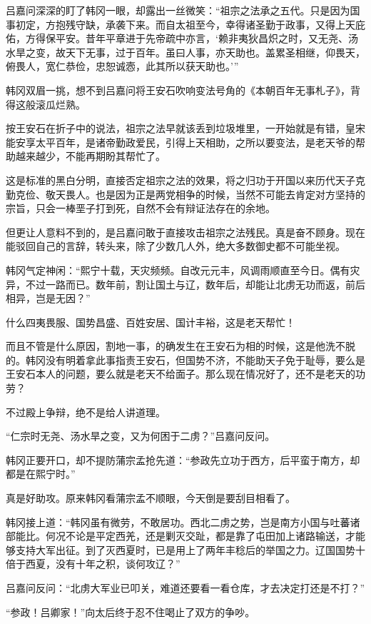 吕嘉问深深的盯了韩冈一眼，却露出一丝微笑：“祖宗之法承之五代。只是因为国事初定，方抱残守缺，承袭下来。而自太祖至今，幸得诸圣勤于政事，又得上天庇佑，方得保平安。昔年平章进于先帝疏中亦言，‘赖非夷狄昌炽之时，又无尧、汤水旱之变，故天下无事，过于百年。虽曰人事，亦天助也。盖累圣相继，仰畏天，俯畏人，宽仁恭俭，忠恕诚悫，此其所以获天助也。’”

韩冈双眉一挑，想不到吕嘉问将王安石吹响变法号角的《本朝百年无事札子》，背得这般滚瓜烂熟。

按王安石在折子中的说法，祖宗之法早就该丢到垃圾堆里，一开始就是有错，皇宋能安享太平百年，是诸帝勤政爱民，引得上天相助，之所以要变法，是老天爷的帮助越来越少，不能再期盼其帮忙了。

这是标准的黑白分明，直接否定祖宗之法的效果，将之归功于开国以来历代天子克勤克俭、敬天畏人。也是因为正是两党相争的时候，当然不可能去肯定对方坚持的宗旨，只会一棒垩子打到死，自然不会有辩证法存在的余地。

但更让人意料不到的，是吕嘉问敢于直接攻击祖宗之法残民。真是奋不顾身。现在能驳回自己的言辞，转头来，除了少数几人外，绝大多数御史都不可能坐视。

韩冈气定神闲：“熙宁十载，天灾频频。自改元元丰，风调雨顺直至今日。偶有灾异，不过一路而已。数年前，割让国土与辽，数年后，却能让北虏无功而返，前后相异，岂是无因？”

什么四夷畏服、国势昌盛、百姓安居、国计丰裕，这是老天帮忙！

而且不管是什么原因，割地一事，的确发生在王安石为相的时候，这是他洗不脱的。韩冈没有明着拿此事指责王安石，但国势不济，不能助天子免于耻辱，要么是王安石本人的问题，要么就是老天不给面子。那么现在情况好了，还不是老天的功劳？

不过殿上争辩，绝不是给人讲道理。

“仁宗时无尧、汤水旱之变，又为何困于二虏？”吕嘉问反问。

韩冈正要开口，却不提防蒲宗孟抢先道：“参政先立功于西方，后平蛮于南方，却都是在熙宁时。”

真是好助攻。原来韩冈看蒲宗孟不顺眼，今天倒是要刮目相看了。

韩冈接上道：“韩冈虽有微劳，不敢居功。西北二虏之势，岂是南方小国与吐蕃诸部能比。何况不论是平定西羌，还是剿灭交趾，都是靠了屯田加上诸路输送，才能够支持大军出征。到了灭西夏时，已是用上了两年丰稔后的举国之力。辽国国势十倍于西夏，没有十年之积，谈何攻辽？”

吕嘉问反问：“北虏大军业已叩关，难道还要看一看仓库，才去决定打还是不打？”

“参政！吕卿家！”向太后终于忍不住喝止了双方的争吵。

